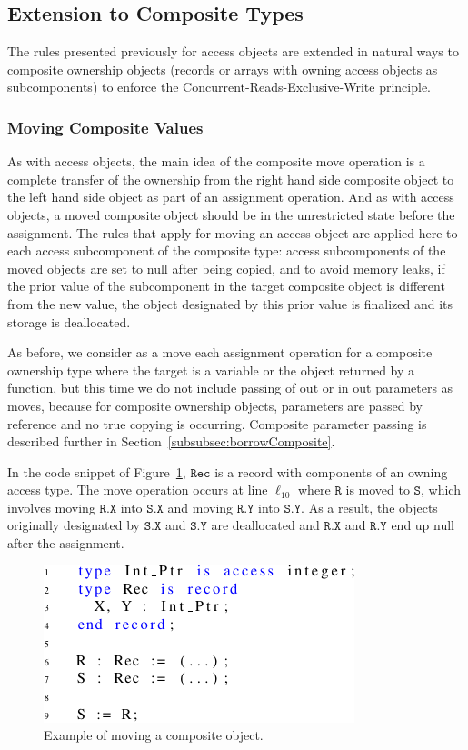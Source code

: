 \documentclass{llncs}
\newcommand\var[1]{\ensuremath{\mathtt{#1}}}
\newcommand{\keyword}[1]{\textsf{#1}}
\begin{document}
\subsection{Extension to Composite Types} 
\label{subsec:ownershipComposite}

The rules presented previously for access objects are extended in natural ways to composite ownership objects (records or arrays with owning access objects as subcomponents) to enforce the Concurrent-Reads-Exclusive-Write principle. 

\subsubsection{Moving Composite Values}
\label{subsubsec:movingComposite}

As with access objects, the main idea of the composite move operation is a complete transfer of the ownership from the right hand side composite object to the left hand
side object as part of an assignment operation. And as with access objects, a moved composite object should be in the unrestricted state before the assignment. The rules that apply for moving an
access object are applied here to each access subcomponent of the composite type: access subcomponents of the moved objects are set to null after being copied, and to avoid memory leaks, if the
prior value of the subcomponent in the target composite object is different from the new value, the object designated by this prior value is finalized and its storage is deallocated.  

As before, we consider as a move each assignment operation for a composite ownership type where the target is a variable or the object returned by a function, but this time we do not
include passing of \keyword{out} or \keyword{in out} parameters as moves, because for composite ownership objects, parameters are passed by reference and no true copying is occurring. Composite parameter passing is described further in Section~\ref{subsubsec:borrowComposite}.

In the code snippet of Figure~\ref{fig:movingComposite}, \var{Rec} is a record with components of an owning access type. The move operation occurs at line $\ell_{10}$ where \var{R} is moved
to \var{S}, which involves moving \var{R.X} into \var{S.X} and moving \var{R.Y} into \var{S.Y}. As a result, the objects originally designated by
\var{S.X} and \var{S.Y} are deallocated and \var{R.X} and \var{R.Y} end up null after the assignment. 


\begin{figure}[htb!]
\centering
   \includegraphics[]{movingComposite}
   \caption{Example of moving a composite object.}
   \label{fig:movingComposite}
\end{figure}
 
\end{document}
